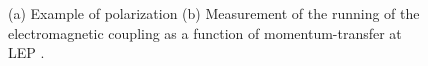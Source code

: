 \begin{figure}
  \centering
  \quad
  \caption{(a) Example of polarization (b) Measurement of the running of the electromagnetic coupling as a function of momentum-transfer at LEP \cite{achard2005}.}
\end{figure}
